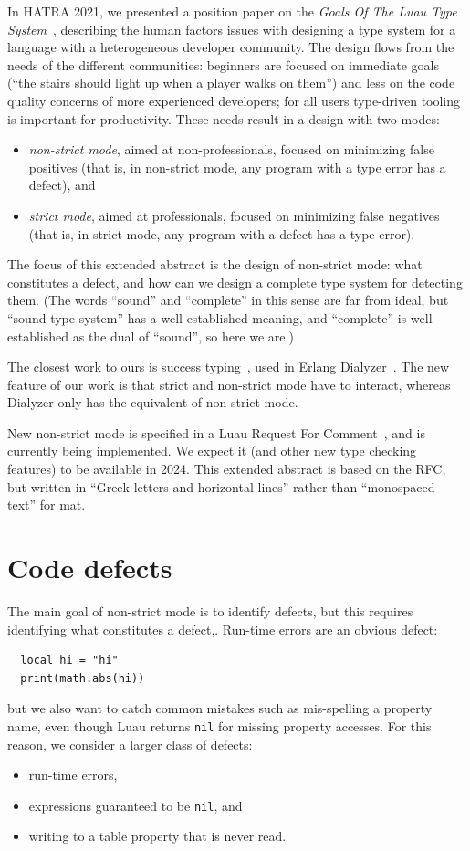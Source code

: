 \documentclass[sigplan]{acmart}
\begin{document}
In HATRA 2021, we presented a position paper on the \emph{Goals Of The Luau Type
System}~\cite{BFJ21:GoalsLuau}, describing the human factors issues
with designing a type system for a language with a heterogeneous
developer community. The design flows from the needs of the different
communities: beginners are focused on immediate goals (``the stairs
should light up when a player walks on them'') and less on the code
quality concerns of more experienced developers; for all users
type-driven tooling is important for productivity. These needs result in a design with two modes:
\begin{itemize}
\item \emph{non-strict mode}, aimed at non-professionals, focused on
  minimizing false positives (that is, in non-strict mode, any program with a type error has a defect), and
\item \emph{strict mode}, aimed at professionals, focused on
  minimizing false negatives (that is, in strict mode, any program with a defect has a type error).
\end{itemize}
The focus of this extended abstract is the design of non-strict mode: what constitutes
a defect, and how can we design a complete type system for detecting them.
(The words ``sound'' and ``complete'' in this sense are far from ideal,
but ``sound type system'' has a well-established meaning, and ``complete''
is well-established as the dual of ``sound'', so here we are.)

The closest work to ours is success typing~\cite{SuccessTyping}, used
in Erlang Dialyzer~\cite{Dialyzer}.  The new feature of our work is
that strict and non-strict mode have to interact, whereas Dialyzer only has
the equivalent of non-strict mode.

New non-strict mode is specified in a Luau Request For
Comment~\cite{NewNonStrictRFC}, and is currently being implemented.
We expect it (and other new type checking features) to be available in
2024. This extended abstract is based on the RFC, but written in
``Greek letters and horizontal lines'' rather than ``monospaced text''
for mat.

\section{Code defects}

The main goal of non-strict mode is to identify defects, but this requires
identifying what constitutes a defect,. Run-time errors are an obvious defect:
\begin{verbatim}
  local hi = "hi"
  print(math.abs(hi))
\end{verbatim}
but we also want to catch common mistakes such as mis-spelling a property name,
even though Luau returns \verb|nil| for missing property accesses.
For this reason, we consider a larger class of defects:
\begin{itemize}
\item run-time errors,
\item expressions guaranteed to be \verb|nil|, and
\item writing to a table property that is never read.
\end{itemize}
\end{document}
